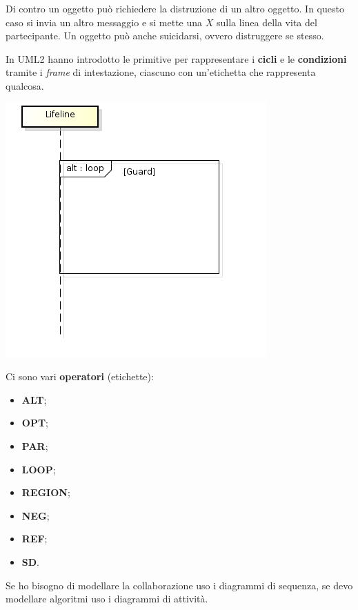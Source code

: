Di contro un oggetto può richiedere la distruzione di un altro oggetto. In questo caso si invia un altro messaggio e si mette una $X$ sulla linea della vita del partecipante. Un oggetto può anche suicidarsi, ovvero distruggere se stesso.

In UML2 hanno introdotto le primitive per rappresentare i \textbf{cicli} e le \textbf{condizioni} tramite i \textit{frame} di intestazione, ciascuno con un'etichetta che rappresenta qualcosa.

\begin{center}
\includegraphics[width=0.75\columnwidth]{img8} %
\end{center}

Ci sono vari \textbf{operatori} (etichette):

\begin{itemize}

	\item \textbf{ALT};
	\item \textbf{OPT};
	\item \textbf{PAR};
	\item \textbf{LOOP};
	\item \textbf{REGION};
	\item \textbf{NEG};
	\item \textbf{REF};
	\item \textbf{SD}.

\end{itemize}

Se ho bisogno di modellare la collaborazione uso i diagrammi di sequenza, se devo modellare algoritmi uso i diagrammi di attività.

